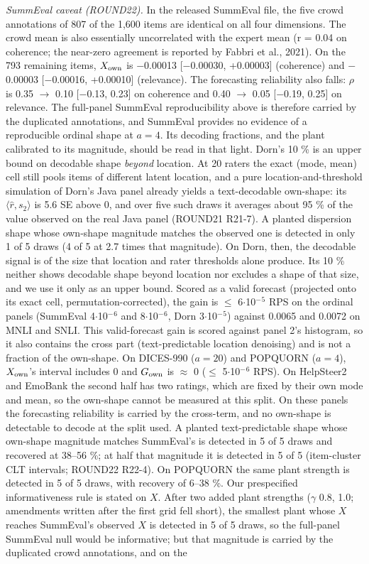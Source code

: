 \documentclass[10pt]{article}
\begin{document}
\emph{SummEval caveat (ROUND22).} In the released SummEval file, the five crowd annotations of 807 of the 1,600 items are identical on all four dimensions. The crowd mean is also essentially uncorrelated with the expert mean (r = 0.04 on coherence; the near-zero agreement is reported by Fabbri et al., 2021). On the 793 remaining items, \(X_{\rm own}\) is $-$0.00013 {[}$-$0.00030, +0.00003{]} (coherence) and $-$0.00003 {[}$-$0.00016, +0.00010{]} (relevance). The forecasting reliability also falls: $\rho$ is 0.35 $\rightarrow$ 0.10 {[}$-$0.13, 0.23{]} on coherence and 0.40 $\rightarrow$ 0.05 {[}$-$0.19, 0.25{]} on relevance. The full-panel SummEval reproducibility above is therefore carried by the duplicated annotations, and SummEval provides no evidence of a reproducible ordinal shape at \(a=4\). Its decoding fractions, and the plant calibrated to its magnitude, should be read in that light. Dorn's 10 \% is an upper bound on decodable shape \emph{beyond} location. At 20 raters the exact (mode, mean) cell still pools items of different latent location, and a pure location-and-threshold simulation of Dorn's Java panel already yields a text-decodable own-shape: its \(\langle\hat r, s_2\rangle\) is 5.6 SE above 0, and over five such draws it averages about 95 \% of the value observed on the real Java panel (ROUND21 R21-7). A planted dispersion shape whose own-shape magnitude matches the observed one is detected in only 1 of 5 draws (4 of 5 at 2.7 times that magnitude). On Dorn, then, the decodable signal is of the size that location and rater thresholds alone produce. Its 10 \% neither shows decodable shape beyond location nor excludes a shape of that size, and we use it only as an upper bound. Scored as a valid forecast (projected onto its exact cell, permutation-corrected), the gain is $\leq$ 6$\cdot$10$^{-}$$^{5}$ RPS on the ordinal panels (SummEval 4$\cdot$10$^{-}$$^{6}$ and 8$\cdot$10$^{-}$$^{6}$, Dorn 3$\cdot$10$^{-}$$^{5}$) against 0.0065 and 0.0072 on MNLI and SNLI. This valid-forecast gain is scored against panel 2's histogram, so it also contains the cross part (text-predictable location denoising) and is not a fraction of the own-shape. On DICES-990 (\(a=20\)) and POPQUORN (\(a=4\)), \(X_{\rm own}\)'s interval includes 0 and \(G_{\rm own}\) is $\approx$ 0 ($\leq$ 5$\cdot$10$^{-}$$^{6}$ RPS). On HelpSteer2 and EmoBank the second half has two ratings, which are fixed by their own mode and mean, so the own-shape cannot be measured at this split. On these panels the forecasting reliability is carried by the cross-term, and no own-shape is detectable to decode at the split used. A planted text-predictable shape whose own-shape magnitude matches SummEval's is detected in 5 of 5 draws and recovered at 38--56 \%; at half that magnitude it is detected in 5 of 5 (item-cluster CLT intervals; ROUND22 R22-4). On POPQUORN the same plant strength is detected in 5 of 5 draws, with recovery of 6--38 \%. Our prespecified informativeness rule is stated on \(X\). After two added plant strengths ($\gamma$ 0.8, 1.0; amendments written after the first grid fell short), the smallest plant whose \(X\) reaches SummEval's observed \(X\) is detected in 5 of 5 draws, so the full-panel SummEval null would be informative; but that magnitude is carried by the duplicated crowd annotations, and on the 
\end{document}
